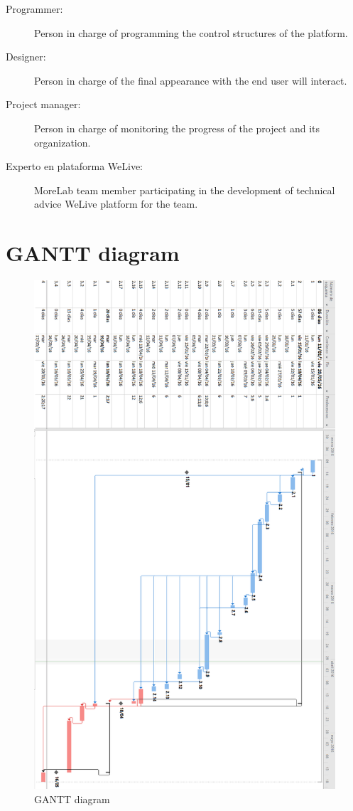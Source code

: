\documentclass{DeustoFDP}
\begin{document}
\begin{description}
	\item[Programmer:] Person in charge of programming the control structures of the platform.
	\item[Designer:] Person in charge of the final appearance with the end user will interact.
	\item[Project manager:] Person in charge of monitoring the progress of the project and its organization.
	\item[Experto en plataforma WeLive:] MoreLab team member participating in the development of technical advice WeLive platform for the team.
\end{description}

\newpage
\section{GANTT diagram}
\begin{figure}[H]
	\centering
	\includegraphics[width=340pt]{fig/gantt}
	\caption{GANTT diagram}\label{fig:gantt}
\end{figure}
\end{document}
